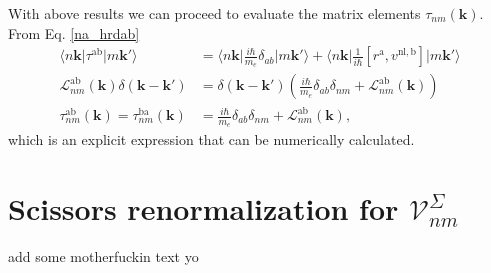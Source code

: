 With above results we can proceed to evaluate the matrix elements
$\tau_{nm}(\mathbf{k})$. From Eq. \eqref{na_hrdab}
\begin{align}\label{na_hrdabn}
\langle n\mathbf{k}\vert \tau^{\mathrm{a}\mathrm{b}} \vert m\mathbf{k}'\rangle
&=\langle n\mathbf{k}\vert\frac{i\hbar}{m_e}\delta_{ab}\vert m\mathbf{k}'\rangle
+ \langle n\mathbf{k}\vert 
\frac{1}{i\hbar}
\left[r^{\mathrm{a}},v^{\mathrm{nl},\mathrm{b}}\right]
\vert m\mathbf{k}'\rangle\nonumber\\
\mathcal{L}^{\mathrm{a}\mathrm{b}}_{nm}(\mathbf{k})
\delta(\mathbf{k}-\mathbf{k}')
&= \delta(\mathbf{k}-\mathbf{k}')
\left(
  \frac{i\hbar}{m_e}\delta_{ab}\delta_{nm}
+ \mathcal{L}_{nm}^{\mathrm{a}\mathrm{b}}(\mathbf{k})
\right)\nonumber\\
\tau^{\mathrm{a}\mathrm{b}}_{nm}(\mathbf{k})
 = \tau^{\mathrm{b}\mathrm{a}}_{nm}(\mathbf{k})
&= \frac{i\hbar}{m_e}\delta_{ab}\delta_{nm}
+ \mathcal{L}_{nm}^{\mathrm{a}\mathrm{b}}(\mathbf{k}),
\end{align}
which is an explicit expression that can be numerically calculated.



\section{Scissors renormalization for 
\texorpdfstring{$\mathcal{V}^\Sigma_{nm}$}{Vnm}}
\label{app:voila}

{\color{red} add some motherfuckin text yo}

